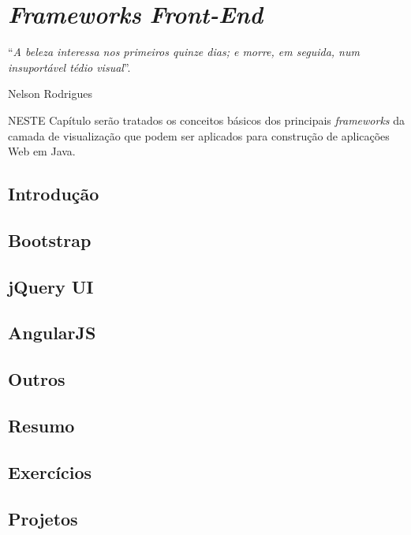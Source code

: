 \chapter{\textit{Frameworks} \textit{Front-End}}\label{cap:frameworksFront}
\epigraph{``\textit{A beleza interessa nos primeiros quinze dias; e morre, em seguida, num insuportável tédio visual}''.}{Nelson Rodrigues}

\lettrine[lines=4, lhang=0.1, lraise=0, loversize=0.2, findent=0.1em]{\textcolor{corAzulTema}{N}}{ESTE} Capítulo serão tratados os conceitos básicos dos principais \textit{frameworks} da camada de visualização que podem ser aplicados para construção de aplicações Web em Java.

\vfill

\section{Introdução}

\section{Bootstrap}

\section{jQuery UI}

\section{AngularJS}

\section{Outros}


\section{Resumo}

\section{Exercícios}

\section{Projetos}

